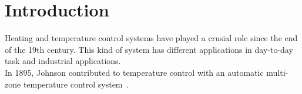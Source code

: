 \section{Introduction}
Heating and temperature control systems have played a crusial role since the end of the 19th century. This kind of system has different applications in day-to-day task and industrial applications.\\


In 1895, Johnson contributed to temperature control with an automatic multi-zone temperature control system~\cite{us542733s}.





